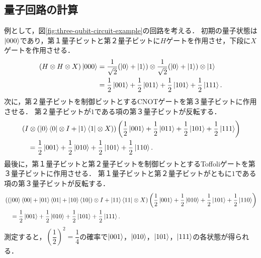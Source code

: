\subsection{量子回路の計算}
例として，図\ref{fig:three-qubit-circuit-example}の回路を考える．
初期の量子状態は$\ket{000}$であり，第１量子ビットと第２量子ビットに$H$ゲートを作用させ，下段に$X$ゲートを作用させる．
\begin{align*}
    \left(H \otimes H \otimes X\right)\ket{000}
     & = \frac{1}{\sqrt{2}}(\ket{0}+\ket{1}) \otimes \frac{1}{\sqrt{2}}(\ket{0}+\ket{1}) \otimes \ket{1} \\
     & = \frac{1}{2}\ket{001} + \frac{1}{2}\ket{011} + \frac{1}{2}\ket{101} + \frac{1}{2}\ket{111}.
\end{align*}
次に，第２量子ビットを制御ビットとするCNOTゲートを第３量子ビットに作用させる．
第２量子ビットが$1$である項の第３量子ビットが反転する．
\begin{align*}
     & \left(I \otimes \left( \ket{0}\bra{0} \otimes I + \ket{1}\bra{1} \otimes X \right)\right)
    \left(\frac{1}{2}\ket{001} + \frac{1}{2}\ket{011} + \frac{1}{2}\ket{101} + \frac{1}{2}\ket{111}\right) \\
     & \quad= \frac{1}{2}\ket{001} + \frac{1}{2}\ket{010} + \frac{1}{2}\ket{101} + \frac{1}{2}\ket{110}.
\end{align*}
最後に，第１量子ビットと第２量子ビットを制御ビットとするToffoliゲートを第３量子ビットに作用させる．
第１量子ビットと第２量子ビットがともに$1$である項の第３量子ビットが反転する．
\begin{align*}
     & \left(\left( \ket{00}\bra{00}+\ket{01}\bra{01}+\ket{10}\bra{10}\right)\otimes I + \ket{11}\bra{11}\otimes X\right)
    \left(\frac{1}{2}\ket{001} + \frac{1}{2}\ket{010} + \frac{1}{2}\ket{101} + \frac{1}{2}\ket{110}\right)                \\
     & \quad= \frac{1}{2}\ket{001} + \frac{1}{2}\ket{010} + \frac{1}{2}\ket{101} + \frac{1}{2}\ket{111}.
\end{align*}
測定すると，$\left(\dfrac{1}{2}\right)^2 = \dfrac{1}{4}$の確率で$\ket{001}$，$\ket{010}$，$\ket{101}$，$\ket{111}$の各状態が得られる．
